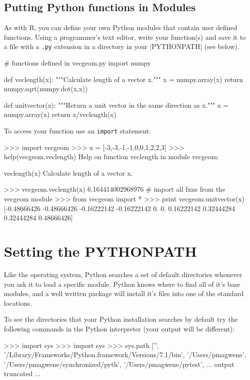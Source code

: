 \subsection{Putting Python functions in Modules}

As with R, you can define your own Python modules that contain user
defined functions. Using a programmer's text editor, write your
function(s) and save it to a file with a \lstinline!.py! extension in a
directory in your |PYTHONPATH| (see below).

\begin{python}
# functions defined in vecgeom.py
import numpy

def veclength(x):
    """Calculate length of a vector x.""" 
    x = numpy.array(x)
    return numpy.sqrt(numpy.dot(x,x))


def unitvector(x):
    """Return a unit vector in the same direction as x."""
    x = numpy.array(x)
    return x/veclength(x)
\end{python}
%
To access your function use an \lstinline!import! statement:
%
\begin{python}
>>> import vecgeom
>>> x = [-3,-3,-1,-1,0,0,1,2,2,3]
>>> help(vecgeom.veclength)
Help on function veclength in module vecgeom:

veclength(x)
    Calculate length of a vector x.

>>> vecgeom.veclength(x)
6.164414002968976
# import all fxns from the vecgeom module
>>> from vecgeom import * 
>>> print vecgeom.unitvector(x)
[-0.48666426 -0.48666426 -0.16222142 -0.16222142  0.          0.   
     0.16222142  0.32444284  0.32444284  0.48666426]
\end{python}



\section{Setting the PYTHONPATH}

Like the operating system, Python searches a set of default directories whenever you ask it to load a specific module.  Python knows where to find all of it's base modules, and a well written package will install it's files into one of the standard locations.

To see the directories that your Python installation searches by default try the following commands in the Python interpreter (your output will be different):
%
\begin{python}
>>> import sys
>>> import sys
>>> sys.path
['', '/Library/Frameworks/Python.framework/Versions/7.1/bin', '/Users/pmagwene', 
'/Users/pmagwene/synchronized/pyth', '/Users/pmagwene/pytest', 
... output truncated ...
\end{python}

